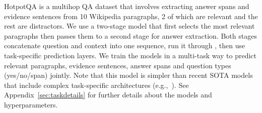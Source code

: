 HotpotQA is a multihop QA dataset that involves extracting answer spans and evidence sentences from 10 Wikipedia paragraphs, 2 of which are relevant and the rest are distractors. We use a two-stage model
that first selects the most relevant paragraphs then passes them to a second stage for answer extraction. Both stages concatenate question and context into one sequence, run it through \model, then use task-specific prediction layers. 
We train the models in a multi-task way to predict relevant paragraphs, evidence sentences, answer spans and question types (yes/no/span) jointly.
Note that this model is simpler than recent SOTA models that include complex task-specific architectures (e.g.,~\cite{Tu2019SelectAA,Chen2019MultihopQA,Tu2020GraphSN,quark2020}). 
See Appendix~\ref{sec:taskdetails} for further details about the models and hyperparameters.


